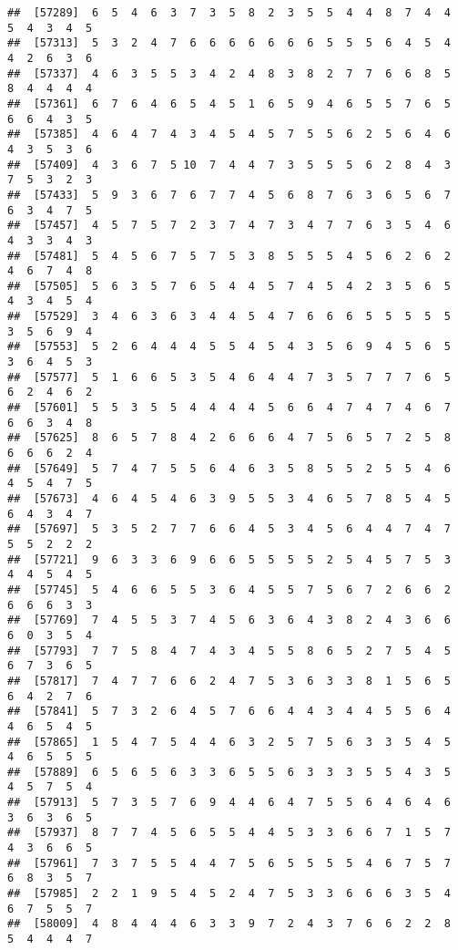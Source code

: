 \documentclass[
]{book}
\begin{document}
\begin{verbatim}
##  [57289]  6  5  4  6  3  7  3  5  8  2  3  5  5  4  4  8  7  4  4  5  4  3  4  5
##  [57313]  5  3  2  4  7  6  6  6  6  6  6  6  5  5  5  6  4  5  4  4  2  6  3  6
##  [57337]  4  6  3  5  5  3  4  2  4  8  3  8  2  7  7  6  6  8  5  8  4  4  4  4
##  [57361]  6  7  6  4  6  5  4  5  1  6  5  9  4  6  5  5  7  6  5  6  6  4  3  5
##  [57385]  4  6  4  7  4  3  4  5  4  5  7  5  5  6  2  5  6  4  6  4  3  5  3  6
##  [57409]  4  3  6  7  5 10  7  4  4  7  3  5  5  5  6  2  8  4  3  7  5  3  2  3
##  [57433]  5  9  3  6  7  6  7  7  4  5  6  8  7  6  3  6  5  6  7  6  3  4  7  5
##  [57457]  4  5  7  5  7  2  3  7  4  7  3  4  7  7  6  3  5  4  6  4  3  3  4  3
##  [57481]  5  4  5  6  7  5  7  5  3  8  5  5  5  4  5  6  2  6  2  4  6  7  4  8
##  [57505]  5  6  3  5  7  6  5  4  4  5  7  4  5  4  2  3  5  6  5  4  3  4  5  4
##  [57529]  3  4  6  3  6  3  4  4  5  4  7  6  6  6  5  5  5  5  5  3  5  6  9  4
##  [57553]  5  2  6  4  4  4  5  5  4  5  4  3  5  6  9  4  5  6  5  3  6  4  5  3
##  [57577]  5  1  6  6  5  3  5  4  6  4  4  7  3  5  7  7  7  6  5  6  2  4  6  2
##  [57601]  5  5  3  5  5  4  4  4  4  5  6  6  4  7  4  7  4  6  7  6  6  3  4  8
##  [57625]  8  6  5  7  8  4  2  6  6  6  4  7  5  6  5  7  2  5  8  6  6  6  2  4
##  [57649]  5  7  4  7  5  5  6  4  6  3  5  8  5  5  2  5  5  4  6  4  5  4  7  5
##  [57673]  4  6  4  5  4  6  3  9  5  5  3  4  6  5  7  8  5  4  5  6  4  3  4  7
##  [57697]  5  3  5  2  7  7  6  6  4  5  3  4  5  6  4  4  7  4  7  5  5  2  2  2
##  [57721]  9  6  3  3  6  9  6  6  5  5  5  5  2  5  4  5  7  5  3  4  4  5  4  5
##  [57745]  5  4  6  6  5  5  3  6  4  5  5  7  5  6  7  2  6  6  2  6  6  6  3  3
##  [57769]  7  4  5  5  3  7  4  5  6  3  6  4  3  8  2  4  3  6  6  6  0  3  5  4
##  [57793]  7  7  5  8  4  7  4  3  4  5  5  8  6  5  2  7  5  4  5  6  7  3  6  5
##  [57817]  7  4  7  7  6  6  2  4  7  5  3  6  3  3  8  1  5  6  5  6  4  2  7  6
##  [57841]  5  7  3  2  6  4  5  7  6  6  4  4  3  4  4  5  5  6  4  4  6  5  4  5
##  [57865]  1  5  4  7  5  4  4  6  3  2  5  7  5  6  3  3  5  4  5  4  6  5  5  5
##  [57889]  6  5  6  5  6  3  3  6  5  5  6  3  3  3  5  5  4  3  5  4  5  7  5  4
##  [57913]  5  7  3  5  7  6  9  4  4  6  4  7  5  5  6  4  6  4  6  3  6  3  6  5
##  [57937]  8  7  7  4  5  6  5  5  4  4  5  3  3  6  6  7  1  5  7  4  3  6  6  5
##  [57961]  7  3  7  5  5  4  4  7  5  6  5  5  5  5  4  6  7  5  7  6  8  3  5  7
##  [57985]  2  2  1  9  5  4  5  2  4  7  5  3  3  6  6  6  3  5  4  6  7  5  5  7
##  [58009]  4  8  4  4  4  6  3  3  9  7  2  4  3  7  6  6  2  2  8  5  4  4  4  7

\end{verbatim}
\end{document}
